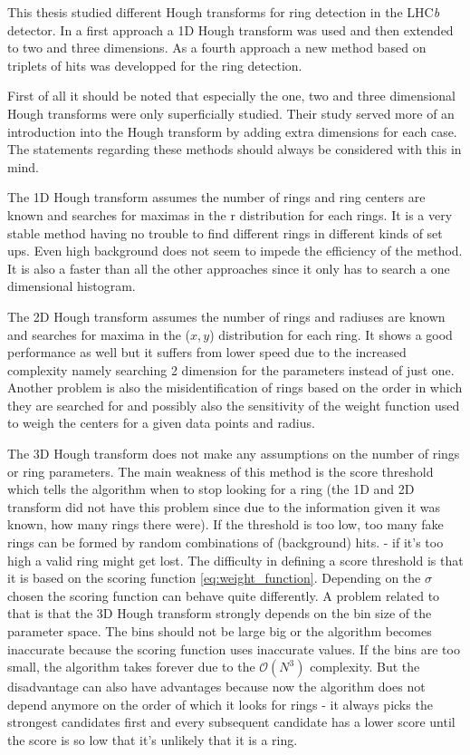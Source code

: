 \documentclass[11pt]{scrreprt}
\begin{document}
This thesis studied different Hough transforms for ring detection in the LHC\textit{b} detector. In a first approach a 1D Hough 
transform was used and then extended to two and three dimensions.
As a fourth approach a new method based on triplets of hits was developped for the ring detection. 

First of all it should be noted that especially the one, two and three dimensional Hough transforms were only superficially studied. Their study served more of an introduction into the Hough transform by adding extra dimensions for each case. The statements regarding these methods should always be considered with this in mind.

The 1D Hough transform assumes the number of rings and ring centers are known and searches for maximas in the r distribution for each rings.
It is a very stable method having no trouble to find different rings in different kinds of set ups. Even high background does not seem to impede the efficiency of the method. It is also a faster than all the other approaches since it only has to search a one dimensional histogram.

The 2D Hough transform assumes the number of rings and radiuses are known and searches for maxima in the ($x,y$) distribution for each ring. It shows a good performance as well but it suffers from lower speed due to the increased complexity namely searching
2 dimension for the parameters instead of just one. Another problem is also the misidentification of rings based on the order in which
they are searched for and possibly also the sensitivity of the weight function used to weigh the centers for a given data points and radius.

The 3D Hough transform does not make any assumptions on the number of rings or ring parameters. The main weakness
of this method is the score threshold which tells the algorithm when to stop looking for a ring (the 1D and 2D transform did not
have this problem since due to the information given it was known, how many rings there were). If the threshold is too low, too many 
fake rings can be formed by random combinations of (background) hits. - if it's too high a valid ring might get lost. The difficulty in defining a score threshold is 
that it is based on the scoring function \ref{eq:weight_function}. Depending on the $\sigma$ chosen the scoring function can behave
quite differently. A problem related to that is that the 3D Hough transform strongly depends on the bin size of the parameter space.
The bins should not be large big or the algorithm becomes inaccurate because the scoring function uses inaccurate values. If the bins are too
small, the algorithm takes forever due to the $\mathcal{O}(N^3)$ complexity. But the disadvantage can also have advantages because
now the algorithm does not depend anymore on the order of which it looks for rings - it always picks the strongest candidates first
and every subsequent candidate has a lower score until the score is so low that it's unlikely that it is a ring.
\end{document}
